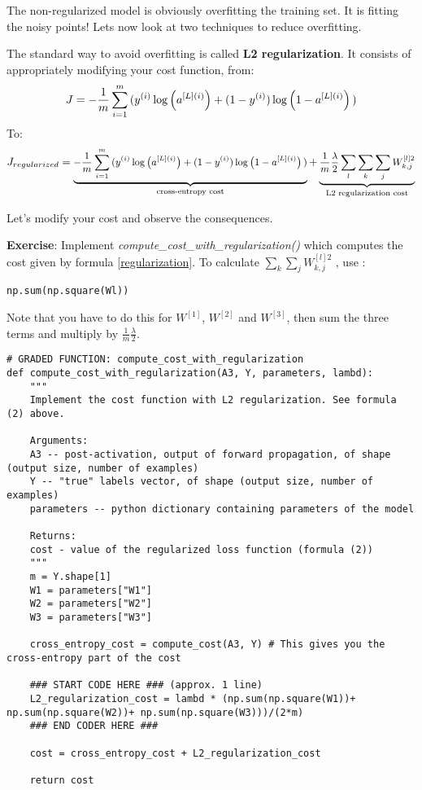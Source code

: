 The non-regularized model is obviously overfitting the training set. It is fitting the noisy points! Lets now look at two techniques to reduce overfitting.




The standard way to avoid overfitting is called {\textbf {L2 regularization}}. It consists of appropriately modifying your cost function, from:
\begin{equation}
J = -\frac{1}{m} \sum\limits_{i = 1}^{m} \large{(}\small  y^{(i)}\log\left(a^{[L](i)}\right) + (1-y^{(i)})\log\left(1- a^{[L](i)}\right) \large{)} 
\end{equation}
To:
\begin{equation}\label{regularization}
J_{regularized} = \small \underbrace{-\frac{1}{m} \sum\limits_{i = 1}^{m} \large{(}\small y^{(i)}\log\left(a^{[L](i)}\right) + (1-y^{(i)})\log\left(1- a^{[L](i)}\right) \large{)} }_\text{cross-entropy cost} + \underbrace{\frac{1}{m} \frac{\lambda}{2} \sum\limits_l\sum\limits_k\sum\limits_j W_{k,j}^{[l]2} }_\text{L2 regularization cost} 
\end{equation}

Let's modify your cost and observe the consequences.

{\textbf {Exercise}}: Implement \emph{compute\_cost\_with\_regularization()} which computes the cost given by formula \eqref{regularization}. To calculate $\sum\limits_k\sum\limits_j W_{k,j}^{[l]2}$  , use :
\begin{verbatim}
np.sum(np.square(Wl))
\end{verbatim}
Note that you have to do this for $W^{[1]}$, $W^{[2]}$ and $W^{[3]}$, then sum the three terms and multiply by $ \frac{1}{m} \frac{\lambda}{2} $.

\begin{verbatim}
# GRADED FUNCTION: compute_cost_with_regularization
def compute_cost_with_regularization(A3, Y, parameters, lambd):
    """
    Implement the cost function with L2 regularization. See formula (2) above.
    
    Arguments:
    A3 -- post-activation, output of forward propagation, of shape (output size, number of examples)
    Y -- "true" labels vector, of shape (output size, number of examples)
    parameters -- python dictionary containing parameters of the model
    
    Returns:
    cost - value of the regularized loss function (formula (2))
    """
    m = Y.shape[1]
    W1 = parameters["W1"]
    W2 = parameters["W2"]
    W3 = parameters["W3"]
    
    cross_entropy_cost = compute_cost(A3, Y) # This gives you the cross-entropy part of the cost
    
    ### START CODE HERE ### (approx. 1 line)
    L2_regularization_cost = lambd * (np.sum(np.square(W1))+ np.sum(np.square(W2))+ np.sum(np.square(W3)))/(2*m) 
    ### END CODER HERE ###
    
    cost = cross_entropy_cost + L2_regularization_cost
    
    return cost
\end{verbatim}

